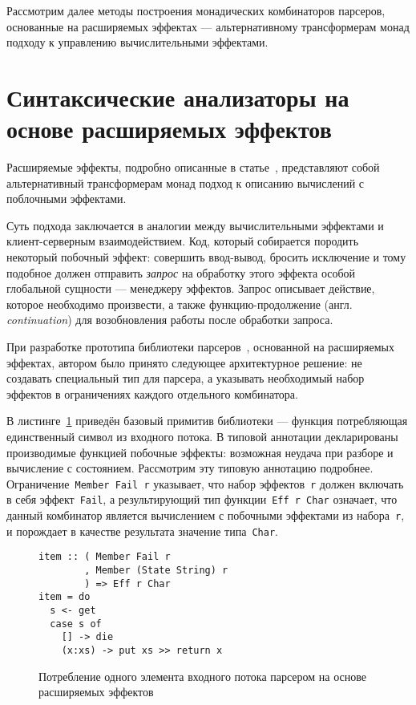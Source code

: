   Рассмотрим далее методы построения монадических комбинаторов парсеров, основанные
  на расширяемых эффектах --- альтернативному трансформерам монад подходу к управлению
  вычислительными эффектами.

\section{Синтаксические анализаторы на основе расширяемых эффектов}

  Расширяемые эффекты, подробно описанные в статье~\cite{extEffects}, представляют
  собой альтернативный трансформерам монад подход к описанию вычислений с поблочными
  эффектами.

  Суть подхода заключается в аналогии между вычислительными эффектами и
  клиент-серверным взаимодействием. Код, который собирается породить некоторый
  побочный эффект: совершить ввод-вывод, бросить исключение и тому подобное должен
  отправить \emph{запрос} на обработку этого эффекта особой глобальной сущности
  --- менеджеру эффектов. Запрос описывает действие, которое необходимо
  произвести, а также функцию-продолжение (англ. \emph{continuation}) для
  возобновления работы после обработки запроса.

  При разработке прототипа библиотеки парсеров~\cite{extEffParsers}, основанной на расширяемых
  эффектах, автором было принято следующее архитектурное решение:
  не создавать специальный тип для парсера, а указывать необходимый набор эффектов
  в ограничениях каждого отдельного комбинатора.

  В листинге~\ref{listing:extEffItem} приведён базовый примитив библиотеки ---
  функция потребляющая единственный символ из входного потока.
  В типовой аннотации декларированы
  производимые функцией побочные эффекты: возможная неудача при разборе и
  вычисление с состоянием. Рассмотрим эту типовую аннотацию подробнее.
  Ограничение~\lstinline{Member Fail r} указывает, что набор
  эффектов~\lstinline{r} должен включать в себя эффект~\lstinline{Fail}, а
  результирующий тип функции~\lstinline{Eff r Char} означает, что данный
  комбинатор является вычислением с побочными эффектами из набора~\lstinline{r},
  и порождает в качестве результата значение типа~\lstinline{Char}.

  \begin{figure}[h]
  \begin{lstlisting}
item :: ( Member Fail r
        , Member (State String) r
        ) => Eff r Char
item = do
  s <- get
  case s of
    [] -> die
    (x:xs) -> put xs >> return x
  \end{lstlisting}
  \caption{Потребление одного элемента входного потока парсером на основе
  расширяемых эффектов}
  \label{listing:extEffItem}
  \end{figure}

